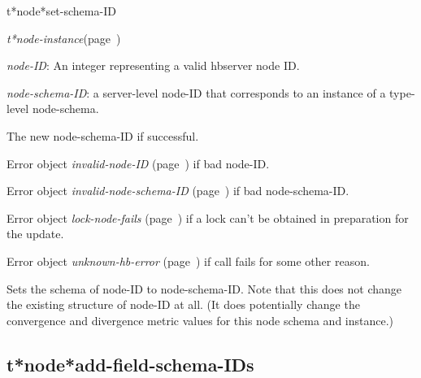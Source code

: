 \begin{description}
\item [Name:]  t*node*set-schema-ID

\item [Class:] {\sl t*node-instance}\hfill(page~\pageref{t*node-instance})

\item [Parameters:]
\item {\sl node-ID}:   An integer representing
a valid hbserver node ID.

\item {\sl node-schema-ID}:  a server-level node-ID that corresponds to an 
instance of a type-level node-schema. 



\item [Return-value:]
The new node-schema-ID if successful.

Error object {\sl invalid-node-ID} (page~\pageref{invalid-node-ID}) if bad node-ID.

Error object {\sl invalid-node-schema-ID} (page~\pageref{invalid-node-schema-ID}) if bad
node-schema-ID.

Error object {\sl lock-node-fails} (page~\pageref{lock-node-fails}) if a lock can't be
obtained in preparation for the update. 

Error object {\sl unknown-hb-error} (page~\pageref{unknown-hb-error}) if call fails for
some other reason.

\item [Description:]

Sets the schema of node-ID to node-schema-ID. Note
that this does not change the existing structure of
node-ID at all. (It does potentially change the
convergence and divergence metric values for this
node schema and instance.)


\item [Public:]






\end{description}
\horizontalline

\subsection{t*node*add-field-schema-IDs}
\label{t*node*add-field-schema-IDs}

